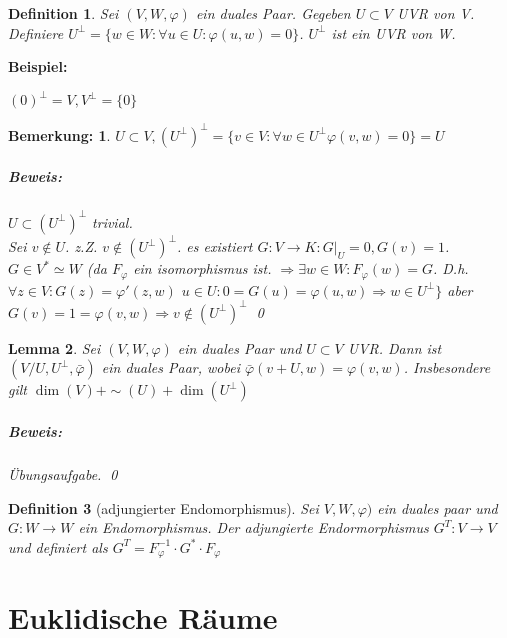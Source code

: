 \documentclass{report}
\newenvironment{beispiel} {
\textbf{Beispiel:}\hfill\break
}{}
\theoremstyle{customrem}
\newtheorem*{bemerkung}{Bemerkung\textnormal:}
\theoremstyle{customdef}
\newtheorem{definition}{Definition}[chapter]
\newtheorem{lemma}[definition]{Lemma}
\renewenvironment{proof}{\paragraph{Beweis: }}{\qed}
\theoremstyle{customenv}
\begin{document}
\begin{definition}
  Sei \((V, W, \varphi)\) ein duales Paar. Gegeben \(U \subset V\) UVR
  von V. Definiere \(
  U^{\bot} = \{w \in W : \forall u \in U : \varphi(u, w) = 0 \}
  \). \(U^\bot\) ist ein UVR von W.
\end{definition}

\begin{beispiel}
  \((0)^\bot = V, V^\bot = \{0\}\)
\end{beispiel}

\begin{bemerkung}
  \(U \subset V,
  (U^\bot)^\bot = \{v \in V : \forall w \in U^\bot \varphi(v, w) = 0\} = U\)
  \begin{proof}
    \(U \subset (U^\bot)^\bot\) trivial.\\
    Sei \(v \not\in U\). z.Z. \(v \not\in (U^\bot)^\bot\).
    es existiert \(G : V \to K : G|_U = 0, G(v) = 1\). \(G \in V^* \simeq W\)
    (da \(F_{\varphi}\) ein isomorphismus ist. \(\Rightarrow \exists w \in W
    : F_{\varphi}(w) = G\). D.h. \(\forall z \in V : G(z) = \varphi'(z, w)\)
    \(u \in U : 0 = G(u) = \varphi(u, w) \Rightarrow w \in U^\bot\}\) aber
    \(G(v) = 1 = \varphi(v, w) \Rightarrow v \not\in (U^\bot)^\bot\)
  \end{proof}
\end{bemerkung}

\begin{lemma}
  Sei \((V, W, \varphi)\) ein duales Paar und \(U \subset V\) UVR. Dann ist
  \((V /U, U^\bot, \bar\varphi)\) ein duales Paar, wobei
  \(\bar\varphi (v+U, w) = \varphi(v, w)\). Insbesondere gilt
  \(\dim(V) + \sim(U) + \dim(U^\bot)\)
  \begin{proof}
    \"Ubungsaufgabe.
  \end{proof}
\end{lemma}

\begin{definition}[adjungierter Endomorphismus]
  Sei \(V, W, \varphi)\) ein duales paar und \(G : W \to W\) ein Endomorphismus.
  Der adjungierte Endormorphismus \(G^T : V \to V\) und definiert als
  \(G^T = F^{-1}_{\varphi} \cdot G^* \cdot F_\varphi\)
\end{definition}

\chapter{Euklidische R\"aume}
\end{document}
